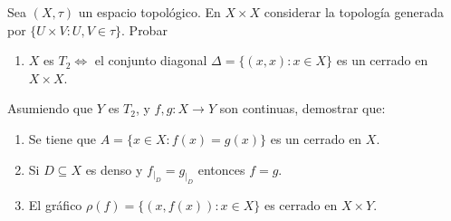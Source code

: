 \documentclass{article}
\theoremstyle{definition}
\newenvironment{ejercicio}[1]{\begin{trivlist}
\item[\hskip \labelsep {\bfseries Ejercicio}\hskip \labelsep {\bfseries #1.}]}{\end{trivlist}}
\begin{document}
\begin{ejercicio}{13}
    Sea \((X, \tau)\) un espacio topológico. En \(X\times X\) considerar la topología generada por \( \{U\times V:U,V\in\tau \} \). Probar
    \begin{enumerate}
        \item \(X\) es \( T_{2}\iff \) el conjunto diagonal \( \Delta = \{ (x,x) : x \in X \} \) es un cerrado en \( X \times X \).
    \end{enumerate}
    Asumiendo que \(Y\) es \( T_{2} \), y \( f,g: X \to Y \) son continuas, demostrar que:
    \begin{enumerate}[resume]
        \item Se tiene que \( A = \{ x \in X : f(x)=g(x) \} \) es un cerrado en \(X\).
        \item Si \( D \subseteq X\) es denso y \(f_{|_{D}} = g_{|_{D}}\) entonces \( f = g \).
        \item El gráfico \( \rho(f) = \{ (x, f(x)) : x \in X\} \) es cerrado en \( X \times Y \).
    \end{enumerate}
\end{ejercicio}
\end{document}
